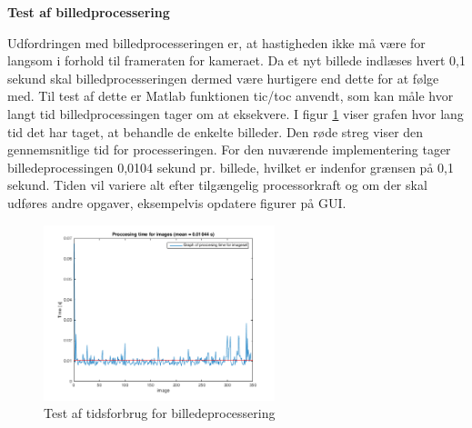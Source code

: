 \newpage
\textbf{Test af billedprocessering}

Udfordringen med billedprocesseringen er, at hastigheden ikke må være for langsom i forhold til frameraten for kameraet. Da et nyt billede indlæses hvert 0,1 sekund skal billedprocesseringen dermed være hurtigere end dette for at følge med. Til test af dette er Matlab funktionen tic/toc anvendt, som kan måle hvor langt tid billedprocessingen tager om at eksekvere. I figur \ref{fig:dataprocess} viser grafen hvor lang tid det har taget, at behandle de enkelte billeder. Den røde streg viser den gennemsnitlige tid for processeringen. For den nuværende implementering tager billedeprocessingen 0,0104 sekund pr. billede, hvilket er indenfor grænsen på 0,1 sekund. Tiden vil variere alt efter tilgængelig processorkraft og om der skal udføres andre opgaver, eksempelvis opdatere figurer på GUI. 

\begin{figure}[H]
	\centering
	\includegraphics[width=0.6\textwidth]{billeder/software/dataprocessing_2.png}
	\caption{Test af tidsforbrug for billedeprocessering}
	\label{fig:dataprocess}
\end{figure}